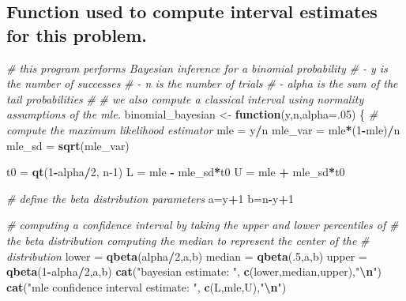 \documentclass[
]{article}
\newenvironment{Shaded}{\begin{snugshade}}{\end{snugshade}}
\newcommand{\AttributeTok}[1]{\textcolor[rgb]{0.13,0.29,0.53}{#1}}
\newcommand{\CommentTok}[1]{\textcolor[rgb]{0.56,0.35,0.01}{\textit{#1}}}
\newcommand{\ControlFlowTok}[1]{\textcolor[rgb]{0.13,0.29,0.53}{\textbf{#1}}}
\newcommand{\DecValTok}[1]{\textcolor[rgb]{0.00,0.00,0.81}{#1}}
\newcommand{\FunctionTok}[1]{\textcolor[rgb]{0.13,0.29,0.53}{\textbf{#1}}}
\newcommand{\NormalTok}[1]{#1}
\newcommand{\OtherTok}[1]{\textcolor[rgb]{0.56,0.35,0.01}{#1}}
\newcommand{\SpecialCharTok}[1]{\textcolor[rgb]{0.81,0.36,0.00}{\textbf{#1}}}
\newcommand{\StringTok}[1]{\textcolor[rgb]{0.31,0.60,0.02}{#1}}
\begin{document}
\hypertarget{function-used-to-compute-interval-estimates-for-this-problem.}{%
\subsection{Function used to compute interval estimates for this
problem.}\label{function-used-to-compute-interval-estimates-for-this-problem.}}

\begin{Shaded}
\begin{Highlighting}[]
\CommentTok{\# this program performs Bayesian inference for a binomial probability}
\CommentTok{\#   {-} y is the number of successes}
\CommentTok{\#   {-} n is the number of trials}
\CommentTok{\#   {-} alpha is the sum of the tail probabilities}
\CommentTok{\#}
\CommentTok{\# we also compute a classical interval using normality assumptions of the mle.}
\NormalTok{binomial\_bayesian }\OtherTok{\textless{}{-}} \ControlFlowTok{function}\NormalTok{(y,n,}\AttributeTok{alpha=}\NormalTok{.}\DecValTok{05}\NormalTok{) \{}
  \CommentTok{\# compute the maximum likelihood estimator}
\NormalTok{  mle }\OtherTok{=}\NormalTok{ y}\SpecialCharTok{/}\NormalTok{n}
\NormalTok{  mle\_var }\OtherTok{=}\NormalTok{ mle}\SpecialCharTok{*}\NormalTok{(}\DecValTok{1}\SpecialCharTok{{-}}\NormalTok{mle)}\SpecialCharTok{/}\NormalTok{n}
\NormalTok{  mle\_sd }\OtherTok{=} \FunctionTok{sqrt}\NormalTok{(mle\_var)}
  
\NormalTok{  t0 }\OtherTok{=} \FunctionTok{qt}\NormalTok{(}\DecValTok{1}\SpecialCharTok{{-}}\NormalTok{alpha}\SpecialCharTok{/}\DecValTok{2}\NormalTok{, n}\DecValTok{{-}1}\NormalTok{)}
\NormalTok{  L }\OtherTok{=}\NormalTok{ mle }\SpecialCharTok{{-}}\NormalTok{ mle\_sd}\SpecialCharTok{*}\NormalTok{t0}
\NormalTok{  U }\OtherTok{=}\NormalTok{ mle }\SpecialCharTok{+}\NormalTok{ mle\_sd}\SpecialCharTok{*}\NormalTok{t0}
  
  \CommentTok{\# define the beta distribution parameters}
\NormalTok{  a}\OtherTok{=}\NormalTok{y}\SpecialCharTok{+}\DecValTok{1}
\NormalTok{  b}\OtherTok{=}\NormalTok{n}\SpecialCharTok{{-}}\NormalTok{y}\SpecialCharTok{+}\DecValTok{1}
  
  \CommentTok{\# computing a confidence interval by taking the upper and lower percentiles of}
  \CommentTok{\# the beta distribution computing the median to represent the center of the}
  \CommentTok{\# distribution}
\NormalTok{  lower }\OtherTok{=} \FunctionTok{qbeta}\NormalTok{(alpha}\SpecialCharTok{/}\DecValTok{2}\NormalTok{,a,b)}
\NormalTok{  median }\OtherTok{=} \FunctionTok{qbeta}\NormalTok{(.}\DecValTok{5}\NormalTok{,a,b)}
\NormalTok{  upper }\OtherTok{=} \FunctionTok{qbeta}\NormalTok{(}\DecValTok{1}\SpecialCharTok{{-}}\NormalTok{alpha}\SpecialCharTok{/}\DecValTok{2}\NormalTok{,a,b)}
  \FunctionTok{cat}\NormalTok{(}\StringTok{"bayesian estimate: "}\NormalTok{, }\FunctionTok{c}\NormalTok{(lower,median,upper),}\StringTok{"}\SpecialCharTok{\textbackslash{}n}\StringTok{"}\NormalTok{)}
  \FunctionTok{cat}\NormalTok{(}\StringTok{"mle confidence interval estimate: "}\NormalTok{, }\FunctionTok{c}\NormalTok{(L,mle,U),}\StringTok{"}\SpecialCharTok{\textbackslash{}n}\StringTok{"}\NormalTok{)}
  

\end{Highlighting}
\end{Shaded}
\end{document}
